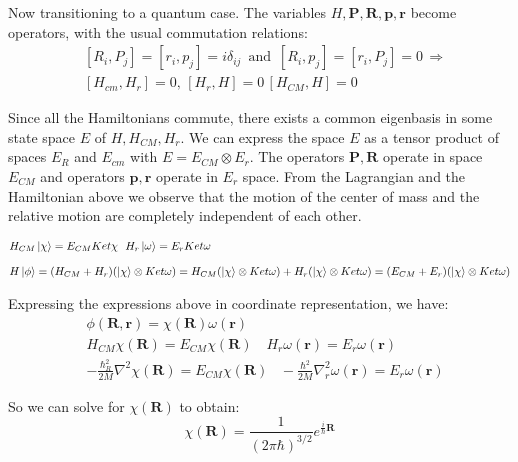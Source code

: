 Now transitioning to a quantum case. The variables $ H, \mathbf{P}, \mathbf{R}, \mathbf{p}, \mathbf{r} $ become operators, with the usual commutation relations:
\begin{equation}
\begin{split}
& [R_i, P_j] = [r_i,p_j] = i\delta_{ij}\,\text{ and }\,[R_i, p_j] = [r_i,P_j] = 0 \,\Longrightarrow \\[.8em]
& [H_{cm},H_r] = 0,\,[H_r,H] = 0\,[H_{CM},H] = 0
\end{split}
\end{equation}

Since all the Hamiltonians commute, there exists a common eigenbasis in some state space $ E $ of $ H,H_{CM}, H_r $. We can express the space $ E $ as a tensor product of spaces $ E_R $ and $ E_{cm} $ with $ E = E_{CM} \otimes E_r $. The operators $ \mathbf{P}, \mathbf{R} $ operate in space $ E_{CM} $ and operators $ \mathbf{p}, \mathbf{r} $ operate in $ E_r $ space. From the Lagrangian and the Hamiltonian above we observe that the motion of the center of mass and the relative motion are completely independent of each other.

\begin{equation}
\begin{split}
& H_{CM}\Ket{\chi} = E_{CM}Ket{\chi}\,\,\,\,H_{r}\Ket{\omega} = E_{r}Ket{\omega}\\[.8em]
& H\Ket{\phi} = (H_{CM} + H_{r})(\Ket{\chi} \otimes Ket{\omega}) = H_{CM}(\Ket{\chi} \otimes Ket{\omega}) + H_{r}(\Ket{\chi} \otimes Ket{\omega}) = (E_{CM} + E_{r})(\Ket{\chi} \otimes Ket{\omega})
\end{split}
\end{equation}

Expressing the expressions above in coordinate representation, we have:
\begin{equation}
\begin{split}
& \phi(\mathbf{R},\mathbf{r}) = \chi(\mathbf{R})\omega(\mathbf{r}) \\[.8em]
& H_{CM}\chi(\mathbf{R}) = E_{CM}\chi(\mathbf{R})\,\,\,\,\,\,H_r\omega(\mathbf{r}) = E_r\omega(\mathbf{r}) \\[.8em]
& -\frac{\hbar_R^2}{2M}\nabla^2\chi(\mathbf{R}) =  E_{CM}\chi(\mathbf{R})\,\,\,\,\,-\frac{\hbar^2}{2M}\nabla_r^2\omega(\mathbf{r}) =  E_{r}\omega(\mathbf{r})
\end{split}
\end{equation}

So we can solve for $ \chi(\mathbf{R}) $ to obtain:
\begin{equation}
\chi(\mathbf{R}) = \frac{1}{(2\pi\hbar)^{3/2}}e^{\frac{i}{\hbar}\mathbf{R}}
\end{equation}


